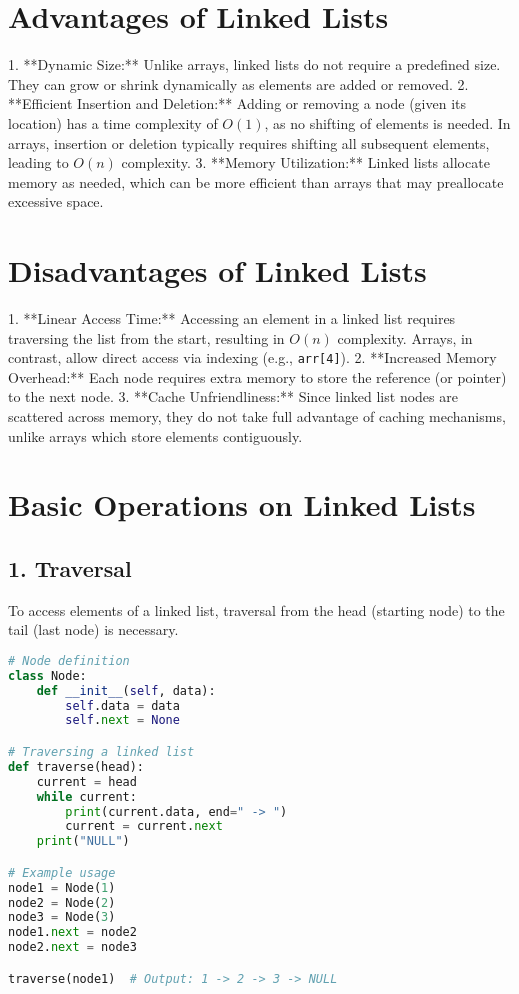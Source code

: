 \section*{Advantages of Linked Lists}
1. **Dynamic Size:** Unlike arrays, linked lists do not require a predefined size. They can grow or shrink dynamically as elements are added or removed.
2. **Efficient Insertion and Deletion:** Adding or removing a node (given its location) has a time complexity of \(O(1)\), as no shifting of elements is needed. In arrays, insertion or deletion typically requires shifting all subsequent elements, leading to \(O(n)\) complexity.
3. **Memory Utilization:** Linked lists allocate memory as needed, which can be more efficient than arrays that may preallocate excessive space.



\section*{Disadvantages of Linked Lists}
1. **Linear Access Time:** Accessing an element in a linked list requires traversing the list from the start, resulting in \(O(n)\) complexity. Arrays, in contrast, allow direct access via indexing (e.g., \texttt{arr[4]}).
2. **Increased Memory Overhead:** Each node requires extra memory to store the reference (or pointer) to the next node.
3. **Cache Unfriendliness:** Since linked list nodes are scattered across memory, they do not take full advantage of caching mechanisms, unlike arrays which store elements contiguously.



\section*{Basic Operations on Linked Lists}

\subsection*{1. Traversal}
To access elements of a linked list, traversal from the head (starting node) to the tail (last node) is necessary.

\begin{fullwidth}
\begin{lstlisting}[language=Python]
# Node definition
class Node:
    def __init__(self, data):
        self.data = data
        self.next = None

# Traversing a linked list
def traverse(head):
    current = head
    while current:
        print(current.data, end=" -> ")
        current = current.next
    print("NULL")

# Example usage
node1 = Node(1)
node2 = Node(2)
node3 = Node(3)
node1.next = node2
node2.next = node3

traverse(node1)  # Output: 1 -> 2 -> 3 -> NULL
\end{lstlisting}
\end{fullwidth}



